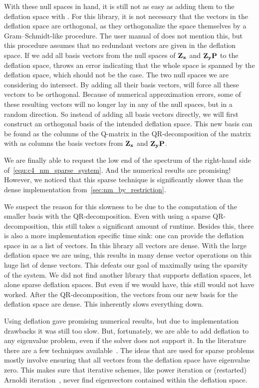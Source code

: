 With these null spaces in hand, it is still not as easy as adding them to the deflation space with \slepc{}. For this library, it is not necessary that the vectors in the deflation space are orthogonal, as they orthogonalize the space themselves by a Gram--Schmidt-like procedure. The user manual of \slepc{} does not mention this, but this procedure assumes that no redundant vectors are given in the deflation space. If we add all basis vectors from the null spaces of $\vb{Z_x}$ and $\vb{Z_y}\vb{P}$ to the deflation space, \slepc{} throws an error indicating that the whole space is spanned by the deflation space, which should not be the case. The two null spaces we are considering do intersect. By adding all their basis vectors, \slepc{} will force all these vectors to be orthogonal. Because of numerical approximation errors, some of these resulting vectors will no longer lay in any of the null spaces, but in a random direction. So instead of adding all basis vectors directly, we will first construct an orthogonal basis of the intended deflation space. This new basis can be found as the columns of the Q-matrix in the QR-decomposition of the matrix with as columns the basis vectors from $\vb{Z_x}$ and $\vb{Z_y} \vb{P}$.

We are finally able to request the low end of the spectrum of the right-hand side of~\eqref{equ:c4_nm_sparse_system}. And the numerical results are promising! However, we noticed that this sparse technique is significantly slower than the dense implementation from~\ref{sec:nm_by_restriction}.

We suspect the reason for this slowness to be due to the computation of the smaller basis with the QR-decomposition. Even with using a sparse QR-decomposition, this still takes a significant amount of runtime. Besides this, there is also a more implementation specific time sink: one can provide the deflation space in \slepc{} as a list of vectors. In this library all vectors are dense. With the large deflation space we are using, this results in many dense vector operations on this huge list of dense vectors. This defeats our goal of maximally using the sparsity of the system. We did not find another library that supports deflation spaces, let alone sparse deflation spaces. But even if we would have, this still would not have worked. After the QR-decomposition, the vectors from our new basis for the deflation space are dense. This inherently slows everything down.

Using deflation gave promising numerical results, but due to implementation drawbacks it was still too slow. But, fortunately, we are able to add deflation to any eigenvalue problem, even if the solver does not support it. In the literature there are a few techniques available~\cite[section 4.2]{saad_numerical_2011}\cite{mackey_deflation_2008}. The ideas that are used for sparse problems mostly involve ensuring that all vectors from the deflation space have eigenvalue zero. This makes sure that iterative schemes, like power iteration or (restarted) Arnoldi iteration~\cite{arnoldi_principle_1951}\cite[Chapter 6]{trefethen_numerical_1997}, never find eigenvectors contained within the deflation space.

